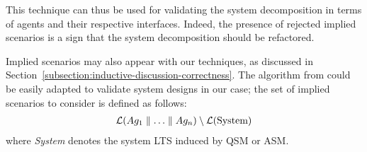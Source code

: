 This technique can thus be used for validating the system decomposition in terms of agents and their respective interfaces. Indeed, the presence of rejected implied scenarios is a sign that the system decomposition should be refactored.

Implied scenarios may also appear with our techniques, as discussed in Section~\ref{subsection:inductive-discussion-correctness}. The algorithm from \cite{Uchitel:2004} could be easily adapted to validate system designs in our case; the set of implied scenarios to consider is defined as follows:
\begin{align*}
\mathcal{L}(Ag_1 \parallel \ldots \parallel Ag_n) \setminus \mathcal{L}(\mbox{System})
\end{align*}
where \emph{System} denotes the system LTS induced by QSM or ASM.





